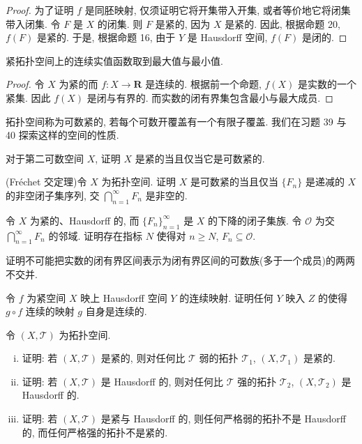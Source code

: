 \documentclass[../../main.tex]{subfiles}
\begin{document}
\begin{proof}
为了证明 $f$ 是同胚映射, 仅须证明它将开集带入开集, 或者等价地它将闭集带入闭集. 令 $F$ 是 $X$ 的闭集. 则 $F$ 是紧的, 因为 $X$ 是紧的. 因此, 根据命题 20, $f(F)$ 是紧的. 于是, 根据命题 16, 由于 $Y$ 是 Hausdorff 空间, $f(F)$ 是闭的.
\end{proof}

\begin{corollary}\label{corollary:ch11-紧空间最值}
紧拓扑空间上的连续实值函数取到最大值与最小值.
\end{corollary}

\begin{proof}
令 $X$ 为紧的而 $f:X\to\mathbf{R}$ 是连续的. 根据前一个命题, $f(X)$ 是实数的一个紧集. 因此 $f(X)$ 是闭与有界的. 而实数的闭有界集包含最小与最大成员.
\end{proof}

拓扑空间称为可数紧的, 若每个可数开覆盖有一个有限子覆盖. 我们在习题 39 与 40 探索这样的空间的性质.

\begin{exercise}\label{exercise:ch11-39}
对于第二可数空间 $X$, 证明 $X$ 是紧的当且仅当它是可数紧的.
\end{exercise}

\begin{exercise}\label{exercise:ch11-40}
(Fr\'echet 交定理)令 $X$ 为拓扑空间. 证明 $X$ 是可数紧的当且仅当 $\{F_{n}\}$ 是递减的 $X$ 的非空闭子集序列, 交 $\bigcap_{n=1}^{\infty}F_{n}$ 是非空的.
\end{exercise}

\begin{exercise}\label{exercise:ch11-41}
令 $X$ 为紧的、Hausdorff 的, 而 $\{F_{n}\}_{n=1}^{\infty}$ 是 $X$ 的下降的闭子集族. 令 $\mathcal{O}$ 为交 $\bigcap_{n=1}^{\infty}F_{n}$ 的邻域. 证明存在指标 $N$ 使得对 $n\geqslant N$, $F_{n}\subseteq\mathcal{O}$.
\end{exercise}

\begin{exercise}\label{exercise:ch11-42}
证明不可能把实数的闭有界区间表示为闭有界区间的可数族(多于一个成员)的两两不交并.
\end{exercise}

\begin{exercise}\label{exercise:ch11-43}
令 $f$ 为紧空间 $X$ 映上 Hausdorff 空间 $Y$ 的连续映射. 证明任何 $Y$ 映入 $Z$ 的使得 $g\circ f$ 连续的映射 $g$ 自身是连续的.
\end{exercise}

\begin{exercise}\label{exercise:ch11-44}
令 $(X,\mathcal{T})$ 为拓扑空间.
\begin{enumerate}[(i)]
\item 证明: 若 $(X,\mathcal{T})$ 是紧的, 则对任何比 $\mathcal{T}$ 弱的拓扑 $\mathcal{T}_{1}$, $(X,\mathcal{T}_{1})$ 是紧的.
\item 证明: 若 $(X,\mathcal{T})$ 是 Hausdorff 的, 则对任何比 $\mathcal{T}$ 强的拓扑 $\mathcal{T}_{2}$, $(X,\mathcal{T}_{2})$ 是 Hausdorff 的.
\item 证明: 若 $(X,\mathcal{T})$ 是紧与 Hausdorff 的, 则任何严格弱的拓扑不是 Hausdorff 的, 而任何严格强的拓扑不是紧的.
\end{enumerate}
\end{exercise}
\end{document}
